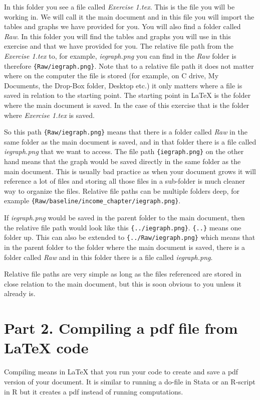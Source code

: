 \documentclass[12pts]{report}
\begin{document}
In this folder you see a file called \emph{Exercise 1.tex}. This is the file you will be working in. We will call it the main document and in this file you will import the tables and graphs we have provided for you. You will also find a folder called \emph{Raw}. In this folder you will find the tables and graphs you will use in this exercise and that we have provided for you. The relative file path from the \emph{Exercise 1.tex} to, for example, \emph{iegraph.png} you can find in the \emph{Raw} folder is therefore \verb|{Raw/iegraph.png}|. Note that to a relative file path it does not matter where on the computer the file is stored (for example, on C drive, My Documents, the Drop-Box folder, Desktop etc.) it only matters where a file is saved in relation to the starting point. The starting point in {\LaTeX} is the folder where the main document is saved. In the case of this exercise that is the folder where \emph{Exercise 1.tex} is saved.

So this path \verb|{Raw/iegraph.png}| means that there is a folder called \emph{Raw} in the same folder as the main document is saved, and in that folder there is a file called \emph{iegraph.png} that we want to access. The file path \verb|{iegraph.png}| on the other hand means that the graph would be saved directly in the same folder as the main document. This is usually bad practice as when your document grows it will reference a lot of files and storing all those files in a sub-folder is much cleaner way to organize the files. Relative file paths can be multiple folders deep, for example \verb|{Raw/baseline/income_chapter/iegraph.png}|. 

If \emph{iegraph.png} would be saved in the parent folder to the main document, then the relative file path would look like this \verb|{../iegraph.png}|. \verb|{..}| means one folder up. This can also be extended to \verb|{../Raw/iegraph.png}| which means that in the parent folder to the folder where the main document is saved, there is a folder called \emph{Raw} and in this folder there is a file called \emph{iegraph.png}.

Relative file paths are very simple as long as the files referenced are stored in close relation to the main document, but this is soon obvious to you unless it already is.

\section*{Part 2. Compiling a pdf file from  {\LaTeX} code}
Compiling means in {\LaTeX} that you run your code to create and save a pdf version of your document. It is similar to running a do-file in Stata or an R-script in R but it creates a pdf instead of running computations. 
\end{document}
